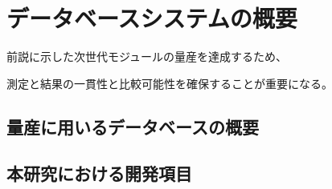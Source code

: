 \chapter{データベースシステムの概要}

前説に示した次世代モジュールの量産を達成するため、

測定と結果の一貫性と比較可能性を確保することが重要になる。

\section{量産に用いるデータベースの概要}

\section{本研究における開発項目}

\newpage
